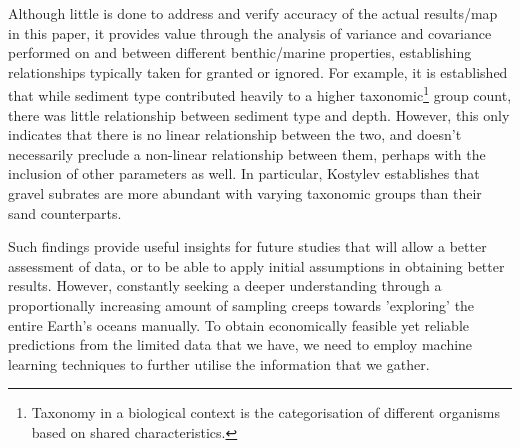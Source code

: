Although little is done to address and verify accuracy of the actual results/map in this paper, it provides value through the analysis of variance and covariance performed on and between different benthic/marine properties, establishing relationships typically taken for granted or ignored. For example, it is established that while sediment type contributed heavily to a higher taxonomic\footnote{Taxonomy in a biological context is the categorisation of different organisms based on shared characteristics.} group count, there was little relationship between sediment type and depth. However, this only indicates that there is no linear relationship between the two, and doesn't necessarily preclude a non-linear relationship between them, perhaps with the inclusion of other parameters as well. In particular, Kostylev establishes that gravel subrates are more abundant with varying taxonomic groups than their sand counterparts.


Such findings provide useful insights for future studies that will allow a better assessment of data, or to be able to apply initial assumptions in obtaining better results. However, constantly seeking a deeper understanding through a proportionally increasing amount of sampling creeps towards 'exploring' the entire Earth's oceans manually. To obtain economically feasible yet reliable predictions from the limited data that we have, we need to employ machine learning techniques to further utilise the information that we gather.

